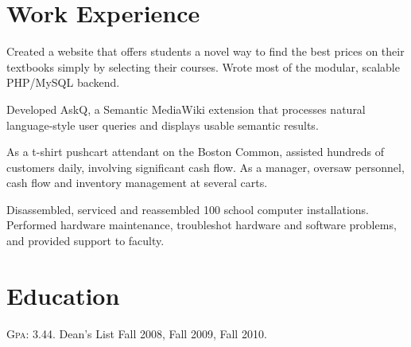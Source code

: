 \documentclass[letterpaper,10pt]{article}
\begin{document}
\section{Work Experience}
\opentable
		{Created a website that offers students a novel way to find the best prices on their textbooks
		 simply by selecting their courses.  Wrote most of the modular, scalable PHP/MySQL backend.}
	
		{Developed AskQ, a Semantic MediaWiki extension that processes natural language-style user 
		queries and displays usable semantic results.}
		
		{As a t-shirt pushcart attendant on the Boston Common, assisted hundreds of customers daily,
		involving significant cash flow.  As a manager, oversaw personnel, cash flow and inventory 
		management at several carts.}
		
		{Disassembled, serviced and reassembled 100 school computer installations.  Performed hardware
		maintenance, troubleshot hardware and software problems, and provided support to faculty.}	
		

\closetable

\section{Education}
\opentable
		{\textsc{Gpa}: 3.44. Dean's List Fall 2008, Fall 2009, Fall 2010.}
\closetable
\end{document}
